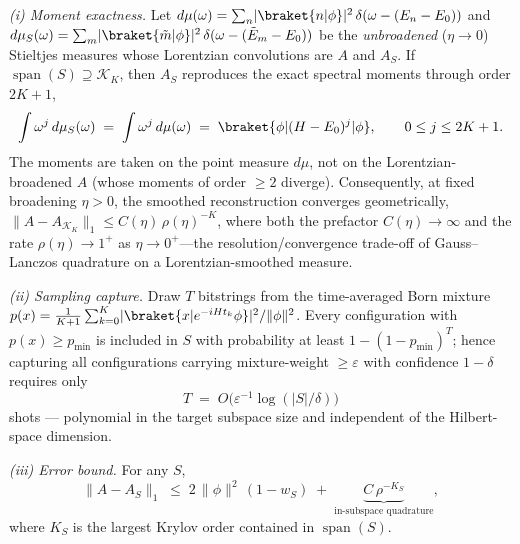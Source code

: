 \begin{theorem}
\label{thm:b2}
\emph{(i) Moment exactness.} Let
$d\mu(\omega)=\sum_n\lvert\braket{n|\phi}\rvert^{2}\,\delta(\omega-(E_n-E_0))$ and
$d\mu_S(\omega)=\sum_m\lvert\braket{\tilde m|\phi}\rvert^{2}\,\delta(\omega-(\tilde E_m-E_0))$ be the
\emph{unbroadened} ($\eta\to0$) Stieltjes measures whose Lorentzian convolutions are $A$ and $A_S$. If
$\operatorname{span}(S)\supseteq\mathcal{K}_K$, then $A_S$ reproduces the exact spectral moments through order $2K+1$,
\begin{equation}
\int \omega^{j}\,d\mu_S(\omega) \;=\; \int \omega^{j}\,d\mu(\omega) \;=\; \braket{\phi|(H-E_0)^{j}|\phi},
\qquad 0\le j\le 2K+1.
\end{equation}
The moments are taken on the point measure $d\mu$, not on the Lorentzian-broadened $A$ (whose moments of
order $\ge2$ diverge). Consequently, at fixed broadening $\eta>0$, the smoothed reconstruction converges
geometrically, $\lVert A-A_{\mathcal{K}_K}\rVert_{1}\le C(\eta)\,\rho(\eta)^{-K}$, where both the
prefactor $C(\eta)\to\infty$ and the rate $\rho(\eta)\to1^{+}$ as $\eta\to0^{+}$---the
resolution/convergence trade-off of Gauss--Lanczos quadrature on a Lorentzian-smoothed measure.

\emph{(ii) Sampling capture.} Draw $T$ bitstrings from the time-averaged Born mixture
$p(x)=\tfrac{1}{K{+}1}\sum_{k=0}^{K}\lvert\braket{x|e^{-iHt_k}\phi}\rvert^{2}/\lVert\phi\rVert^{2}$.
Every configuration with $p(x)\ge p_{\min}$ is included in $S$ with probability at least
$1-(1-p_{\min})^{T}$; hence capturing all configurations carrying mixture-weight $\ge\varepsilon$
with confidence $1-\delta$ requires only
\begin{equation}
T \;=\; O\!\big(\varepsilon^{-1}\log(|S|/\delta)\big)
\end{equation}
shots --- polynomial in the target subspace size and independent of the Hilbert-space dimension.

\emph{(iii) Error bound.} For any $S$,
\begin{equation}
\lVert A-A_S\rVert_{1}\;\le\;2\,\lVert\phi\rVert^{2}\,(1-w_S)\;+\;\underbrace{C\,\rho^{-K_S}}_{\text{in-subspace quadrature}},
\end{equation}
where $K_S$ is the largest Krylov order contained in $\operatorname{span}(S)$.
\end{theorem}

